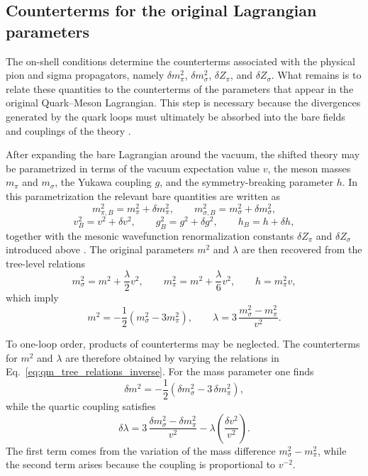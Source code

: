 \subsection{Counterterms for the original Lagrangian parameters}

The on-shell conditions determine the counterterms associated with the
physical pion and sigma propagators, namely \(\delta m_\pi^2\),
\(\delta m_\sigma^2\), \(\delta Z_\pi\), and \(\delta Z_\sigma\).
What remains is to relate these quantities to the counterterms of the
parameters that appear in the original Quark--Meson Lagrangian. This
step is necessary because the divergences generated by the quark loops
must ultimately be absorbed into the bare fields and couplings of the
theory \cite{Folkestad2018,Andersen2024}.

After expanding the bare Lagrangian around the vacuum, the shifted
theory may be parametrized in terms of the vacuum expectation value
\(v\), the meson masses \(m_\pi\) and \(m_\sigma\), the Yukawa
coupling \(g\), and the symmetry-breaking parameter \(h\). In this
parametrization the relevant bare quantities are written as
\begin{equation}
m_{\pi,B}^2 = m_\pi^2 + \delta m_\pi^2,
\qquad
m_{\sigma,B}^2 = m_\sigma^2 + \delta m_\sigma^2,
\end{equation}
\begin{equation}
v_B^2 = v^2 + \delta v^2,
\qquad
g_B^2 = g^2 + \delta g^2,
\qquad
h_B = h + \delta h ,
\end{equation}
together with the mesonic wavefunction renormalization constants
\(\delta Z_\pi\) and \(\delta Z_\sigma\) introduced above
\cite{Folkestad2018}. The original parameters \(m^2\) and
\(\lambda\) are then recovered from the tree-level relations
\begin{equation}
m_\sigma^2 = m^2 + \frac{\lambda}{2}v^2,
\qquad
m_\pi^2 = m^2 + \frac{\lambda}{6}v^2,
\qquad
h = m_\pi^2 v ,
\label{eq:qm_tree_relations_shifted}
\end{equation}
which imply
\begin{equation}
m^2 = -\frac{1}{2}\left(m_\sigma^2 - 3m_\pi^2\right),
\qquad
\lambda = 3\,\frac{m_\sigma^2-m_\pi^2}{v^2}.
\label{eq:qm_tree_relations_inverse}
\end{equation}

To one-loop order, products of counterterms may be neglected. The
counterterms for \(m^2\) and \(\lambda\) are therefore obtained by
varying the relations in Eq.~\eqref{eq:qm_tree_relations_inverse}. For
the mass parameter one finds
\begin{equation}
\delta m^2
=
-\frac{1}{2}
\left(
\delta m_\sigma^2
-
3\,\delta m_\pi^2
\right),
\label{eq:qm_delta_m2}
\end{equation}
while the quartic coupling satisfies
\begin{equation}
\delta\lambda
=
3\,\frac{\delta m_\sigma^2-\delta m_\pi^2}{v^2}
-
\lambda
\left(
\frac{\delta v^2}{v^2}
\right).
\label{eq:qm_delta_lambda_prelim}
\end{equation}
The first term comes from the variation of the mass difference
\(m_\sigma^2-m_\pi^2\), while the second term arises because the
coupling is proportional to \(v^{-2}\).

